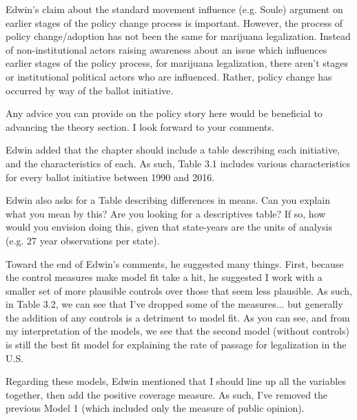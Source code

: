 \documentclass[12pt,stdletter,dateno,sigleft]{newlfm} %
\begin{document}
\begin{newlfm}
Edwin's claim about the standard movement influence (e.g. Soule) argument on earlier stages of the policy change process is important. However, the process of policy change/adoption has not been the same for marijuana legalization. Instead of non-institutional actors raising awareness about an issue which influences earlier stages of the policy process, for marijuana legalization, there aren't stages or institutional political actors who are influenced. Rather, policy change has occurred by way of the ballot initiative. 

Any advice you can provide on the policy story here would be beneficial to advancing the theory section. I look forward to your comments. 


Edwin added that the chapter should include a table describing each initiative, and the characteristics of each. As such, Table 3.1 includes various characteristics for every ballot initiative between 1990 and 2016. 

Edwin also asks for a Table describing differences in means. Can you explain what you mean by this? Are you looking for a descriptives table? If so, how would you envision doing this, given that state-years are the units of analysis (e.g. 27 year observations per state). 

Toward the end of Edwin's comments, he suggested many things. First, because the control measures make model fit take a hit, he suggested I work with a smaller set of more plausible controls over those that seem less plausible. As such, in Table 3.2, we can see that I've dropped some of the measures... but generally the addition of any controls is a detriment to model fit. As you can see, and from my interpretation of the models, we see that the second model (without controls) is still the best fit model for explaining the rate of passage for legalization in the U.S.

Regarding these models, Edwin mentioned that I should line up all the variables together, then add the positive coverage measure. As such, I've removed the previous Model 1 (which included only the measure of public opinion).


\end{newlfm}
\end{document}
